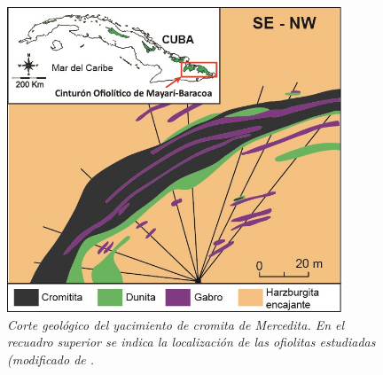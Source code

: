 \documentclass[a4paper,11pt]{article}
\begin{document}
	\begin{figure}[h]
		\centering
		\includegraphics[width=100mm]{Figura1.jpg}
		\caption{\sl Corte geológico del yacimiento de cromita de Mercedita. En el recuadro superior se indica la localización de las ofiolitas estudiadas (modificado de \cite{Pujol-Sola2018}.}
		\label{Fig1}
	\end{figure}
			
\end{document}
